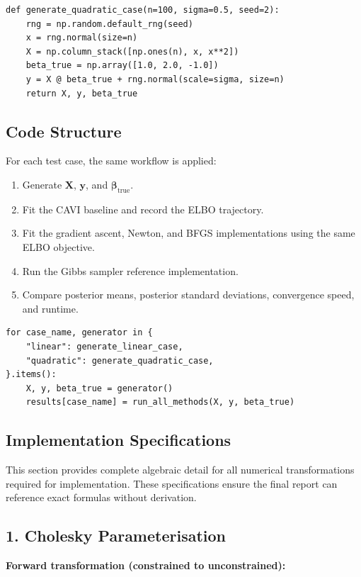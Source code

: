 \documentclass[11pt,a4paper]{article}
\begin{document}
\begin{verbatim}
def generate_quadratic_case(n=100, sigma=0.5, seed=2):
    rng = np.random.default_rng(seed)
    x = rng.normal(size=n)
    X = np.column_stack([np.ones(n), x, x**2])
    beta_true = np.array([1.0, 2.0, -1.0])
    y = X @ beta_true + rng.normal(scale=sigma, size=n)
    return X, y, beta_true
\end{verbatim}

\subsection{Code Structure}

For each test case, the same workflow is applied:
\begin{enumerate}
\item Generate $\bm{X}$, $\bm{y}$, and $\bm{\beta}_{\mathrm{true}}$.
\item Fit the CAVI baseline and record the ELBO trajectory.
\item Fit the gradient ascent, Newton, and BFGS implementations using the same ELBO objective.
\item Run the Gibbs sampler reference implementation.
\item Compare posterior means, posterior standard deviations, convergence speed, and runtime.
\end{enumerate}

\begin{verbatim}
for case_name, generator in {
    "linear": generate_linear_case,
    "quadratic": generate_quadratic_case,
}.items():
    X, y, beta_true = generator()
    results[case_name] = run_all_methods(X, y, beta_true)
\end{verbatim}
\subsection{Implementation Specifications}

This section provides complete algebraic detail for all numerical transformations required for implementation. These specifications ensure the final report can reference exact formulas without derivation.

\subsection*{1. Cholesky Parameterisation}

\textbf{Forward transformation (constrained to unconstrained):}
\end{document}

